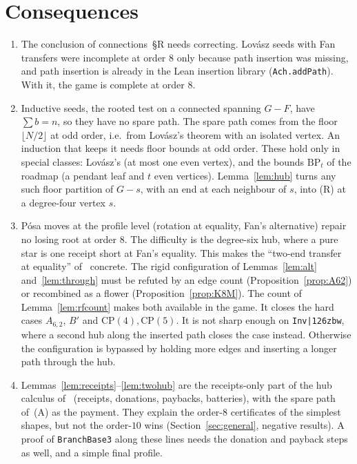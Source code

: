 \documentclass[11pt]{amsart}
\theoremstyle{definition}
\begin{document}
\section{Consequences}\label{sec:conseq}

\begin{enumerate}
\item The conclusion of connections~\S R needs correcting. Lov\'asz seeds with Fan transfers were
incomplete at order $8$ only because path insertion was missing, and path insertion is already in
the Lean insertion library (\texttt{Ach.addPath}). With it, the game is complete at order $8$.
\item Inductive seeds, the rooted test on a connected spanning $G-F$, have $\sum b=n$, so they have
no spare path. The spare path comes from the floor $\lfloor N/2\rfloor$ at odd order, i.e.\ from
Lov\'asz's theorem with an isolated vertex. An induction that keeps it needs floor bounds at odd
order. These hold only in special classes: Lov\'asz's (at most one even vertex), and the bounds
$\mathrm{BP}_t$ of the roadmap (a pendant leaf and $t$ even vertices). Lemma~\ref{lem:hub} turns any
such floor partition of $G-s$, with an end at each neighbour of $s$, into (R) at a degree-four
vertex $s$.
\item P\'osa moves at the profile level (rotation at equality, Fan's alternative) repair no
losing root at order $8$. The difficulty is the degree-six hub, where a pure star is one receipt short at Fan's
equality. This makes the ``two-end transfer at equality'' of~\cite{D6} concrete. The rigid
configuration of Lemmas~\ref{lem:alt} and~\ref{lem:through} must be refuted by an edge count
(Proposition~\ref{prop:A62}) or recombined as a flower (Proposition~\ref{prop:K8M}). The count of
Lemma~\ref{lem:rfcount} makes both available in the game. It closes the hard cases $A_{6,2}$,
$B'$ and $\mathrm{CP}(4),\mathrm{CP}(5)$. It is not sharp enough on \texttt{Inv|\char126zbw},
where a second hub along the inserted path closes the case instead.
Otherwise the configuration is bypassed by holding more edges and inserting a longer path through
the hub.
\item Lemmas~\ref{lem:receipts}--\ref{lem:twohub} are the receipts-only part of the hub calculus
of~\cite{D6} (receipts, donations, paybacks, batteries), with the spare path of~(A) as the payment.
They explain the order-$8$ certificates of the simplest shapes, but not the order-$10$ wins
(Section~\ref{sec:general}, negative results). A proof of \texttt{BranchBase3} along these lines
needs the donation and payback steps as well, and a simple final profile.
\end{enumerate}
\end{document}
